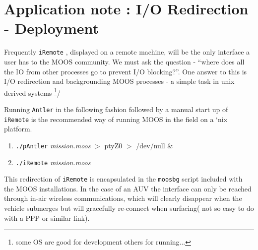 \documentclass[a4paper,10pt]{article}
\newcommand{\Code}[1]{\texttt{#1} }
\newcommand{\code}[1]{\Code{#1} }
\begin{document}
\section{Application note : I/O Redirection - Deployment} 
Frequently \code{iRemote}, displayed on a remote machine, will be
the only interface a user has to the MOOS community.  We
must ask the question -  ``where does all the IO from other
processes go to prevent I/O blocking?''. One answer to this is I/O
redirection and backgrounding MOOS processes - a simple task in
unix derived systems \footnote{some OS are good for development
others for running...}/

Running \code{Antler} in the following fashion followed by a
manual start up of \code{iRemote} is the recommended way of
running MOOS in the field on a `nix platform.

\begin{enumerate}
\item \code{./pAntler} {\it{mission.moos}} $>$ ptyZ0 $>$ /dev/null \&
\item \code{./iRemote} {\it{mission.moos}}
\end{enumerate}

This redirection of \code{iRemote} is encapsulated in the
\code{moosbg} script included with the MOOS installations. In the
case of an AUV the interface can only be reached  through in-air
wireless communications, which will clearly disappear when the
vehicle submerges but will gracefully re-connect when surfacing(
not so easy to do with a PPP or similar link). 
\end{document}
